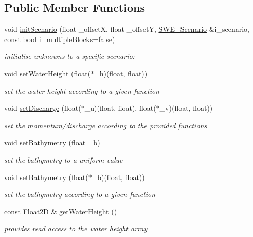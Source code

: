 \subsection*{Public Member Functions}
\begin{DoxyCompactItemize}
\item 
void \hyperlink{classSWE__Block_a46b715c584468a5daa975ec1eb1ab947}{init\-Scenario} (float \-\_\-offset\-X, float \-\_\-offset\-Y, \hyperlink{classSWE__Scenario}{S\-W\-E\-\_\-\-Scenario} \&i\-\_\-scenario, const bool i\-\_\-multiple\-Blocks=false)
\begin{DoxyCompactList}\small\item\em initialise unknowns to a specific scenario\-: \end{DoxyCompactList}\item 
void \hyperlink{classSWE__Block_a6481ce1c80a219fbefefdcbd13ed3688}{set\-Water\-Height} (float($\ast$\-\_\-h)(float, float))
\begin{DoxyCompactList}\small\item\em set the water height according to a given function \end{DoxyCompactList}\item 
void \hyperlink{classSWE__Block_a245332c325fd0ff6a7e9c2d3d9454970}{set\-Discharge} (float($\ast$\-\_\-u)(float, float), float($\ast$\-\_\-v)(float, float))
\begin{DoxyCompactList}\small\item\em set the momentum/discharge according to the provided functions \end{DoxyCompactList}\item 
void \hyperlink{classSWE__Block_af2ab34b138a14f2c295849f3b2acc5f3}{set\-Bathymetry} (float \-\_\-b)
\begin{DoxyCompactList}\small\item\em set the bathymetry to a uniform value \end{DoxyCompactList}\item 
void \hyperlink{classSWE__Block_ad4214fcfd102a4c167d274ad87d9dd90}{set\-Bathymetry} (float($\ast$\-\_\-b)(float, float))
\begin{DoxyCompactList}\small\item\em set the bathymetry according to a given function \end{DoxyCompactList}\item 
const \hyperlink{classFloat2D}{Float2\-D} \& \hyperlink{classSWE__Block_ab1aea4294403c194180c3dc107339fd7}{get\-Water\-Height} ()
\begin{DoxyCompactList}\small\item\em provides read access to the water height array \end{DoxyCompactList}\item 

\end{DoxyCompactItemize}

